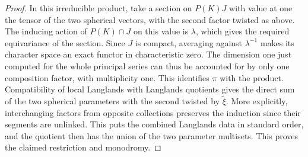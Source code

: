 \documentclass[a4paper,11pt]{article}
\theoremstyle{definition}
\theoremstyle{remark}
\numberwithin{equation}{section}
\begin{document}
\begin{proof}
In this irreducible product, take a section on \(P(K)J\) with
value at one the tensor of the two spherical vectors, with the
second factor twisted as above. The inducing action of \(P(K)\cap J\)
on this value is \(\lambda\), which gives the required
equivariance of the section. Since \(J\) is compact, averaging
against \(\lambda^{-1}\) makes its character space an exact
functor in characteristic zero. The dimension one just computed
for the whole principal series can thus be accounted for by only
one composition factor, with multiplicity one. This identifies
\(\pi\) with the product. Compatibility of local Langlands with
Langlands quotients gives the direct sum of the two spherical
parameters with the second twisted by \(\widetilde\xi\). More
explicitly, interchanging factors from opposite collections preserves
the induction since their segments are unlinked. This puts the
combined Langlands data in standard order, and the quotient
then has the union of the two parameter multisets. This proves
the claimed restriction and monodromy.
\end{proof}
\end{document}
